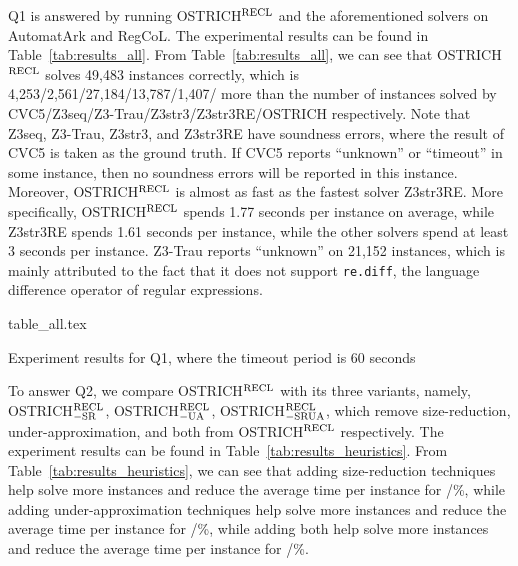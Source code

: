 Q1 is answered by running OSTRICH$^{\rm RECL}$ and the aforementioned solvers on AutomatArk and RegCoL. The experimental results can be found in Table~\ref{tab:results_all}. From Table~\ref{tab:results_all}, we can see that OSTRICH$^{\rm RECL}$ solves 49,483 instances correctly, which is 4,253/2,561/27,184/13,787/1,407/ more than the number of instances solved by CVC5/Z3seq/Z3-Trau/Z3str3/Z3str3RE/OSTRICH respectively. 
%    
Note that Z3seq, Z3-Trau, Z3str3, and Z3str3RE have soundness errors, where the result of CVC5 is taken as the ground truth.  If CVC5 reports ``unknown'' or ``timeout'' in some instance, then no soundness errors will be reported in this instance. 
%
Moreover, OSTRICH$^{\rm RECL}$ is almost as fast as the fastest solver Z3str3RE. More specifically, OSTRICH$^{\rm RECL}$ spends 1.77 seconds per instance on average, while Z3str3RE spends 1.61 seconds per instance, while the other solvers spend at least 3 seconds per instance.  
Z3-Trau reports ``unknown'' on 21,152 instances, which is mainly attributed to the fact that it does not support \verb|re.diff|, the language difference operator of regular expressions. 


\begin{table}[ht]
\begin{center}
  {table_all.tex}
\end{center}
  \caption{Experiment results for Q1, where the timeout period is 60 seconds}
  \label{tab:results_all}
\end{table}


To answer Q2, we compare OSTRICH$^{\rm RECL}$ with its three variants, namely, OSTRICH$^{\rm RECL}_{\rm -SR}$, OSTRICH$^{\rm RECL}_{\rm -UA}$, OSTRICH$^{\rm RECL}_{\rm -SRUA}$, which remove size-reduction, under-approximation, and both from OSTRICH$^{\rm RECL}$ respectively. The experiment results can be found in Table~\ref{tab:results_heuristics}.
From Table~\ref{tab:results_heuristics}, we can see that adding size-reduction techniques help solve  more instances and reduce the average time per instance for /\%, while adding under-approximation techniques help solve  more instances and reduce the average time per instance for /\%, while adding both help solve  more instances and reduce the average time per instance for /\%. 


